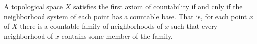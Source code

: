 A topological space $X$ satisfies the first axiom of countability if and only if the neighborhood system of each point has a countable base. That is, for each point $x$ of $X$ there is a countable family of neighborhoods of $x$ such that every neighborhood of $x$ contains some member of the family.
